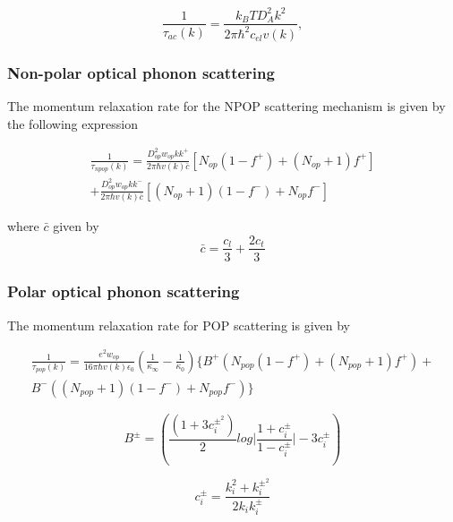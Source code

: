 \documentclass[12pt]{article}
\begin{document}
\begin{equation}
\frac{1}{\tau_{ac}(k)} = \frac{k_B T D_A^2 k^2}{2\pi\hbar^2 c_{el}v(k)} ,
\label{acoustic_deformation_p}
\end{equation}

\subsubsection{Non-polar optical phonon scattering}
The momentum relaxation rate for the NPOP scattering mechanism is given by the following expression \cite{ramu2011thermoelectric} 

\begin{multline}
\frac{1}{\tau_{npop}(k)} = \frac{D_{op}^2 w_{op}kk^+}{2\pi \hbar v(k) \bar{c}} \left[ N_{op}(1-f^+) + (N_{op}+1) f^+ \right] \\ + \frac{D_{op}^2 w_{op}kk^-}{2\pi \hbar v(k) \bar{c}} \left[ (N_{op}+1)(1-f^-) + N_{op} f^- \right]
\label{npop_p}
\end{multline}

where $\bar{c}$  given by
\begin{equation}
\bar{c} = \frac{c_l}{3}  + \frac{2 c_t}{3}
\label{c_bar}
\end{equation}  

\subsubsection{Polar optical phonon scattering}
The momentum relaxation rate for POP scattering is given by \cite{ramu2011thermoelectric} 

\begin{multline}
\frac{1}{\tau_{pop}(k)} =  \frac{e^2 w_{op}}{16\pi \hbar v(k) \epsilon_0}  \left( \frac{1}{\kappa_\infty} - \frac{1}{\kappa_0} \right) \{ B^+  \left( N_{pop}(1-f^+) + (N_{pop} +1) f^+ \right) + \\ B^- \left( (N_{pop}+1)(1-f^-) + N_{pop} f^- \right) \}
\label{pop_p}
\end{multline}

\begin{equation}
B^{\pm} = \left( \frac{(1+3c_i^{\pm^2})}{2} log\Bigg| \frac{1+c_i^{\pm}}{1-c_i^{\pm}} \Bigg| - 3c_i^{\pm}\right) 
\label{B_pm}
\end{equation}

\begin{equation}
c_i^{\pm} =  \frac{k_i^2 + k_i^{\pm^2}} {2k_i k_i^{\pm} } 
\label{c_i}
\end{equation}
\end{document}
